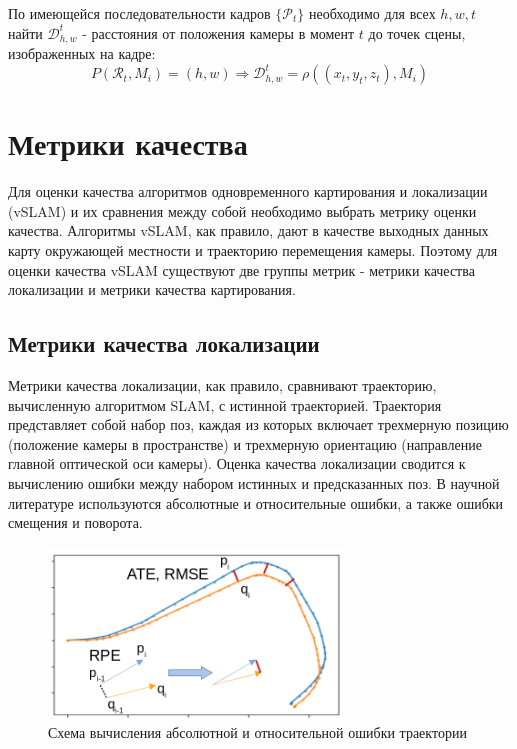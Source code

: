 \documentclass{mipt-thesis-ms}
\begin{document}
	По имеющейся последовательности кадров $\{\mathcal{P}_t\}$ необходимо для всех $h,w,t$ найти $\mathcal{D}^t_{h,w}$ - расстояния от положения камеры в момент $t$ до точек сцены, изображенных на кадре:
	$$P(\mathcal{R}_t, M_i) = (h, w) \Rightarrow \mathcal{D}^t_{h,w} = \rho((x_t, y_t, z_t), M_i)$$
	
	
	\section{Метрики качества}
	
	Для оценки качества алгоритмов одновременного картирования и локализации (vSLAM) и их сравнения между собой необходимо выбрать метрику оценки качества. Алгоритмы vSLAM, как правило, дают в качестве выходных данных карту окружающей местности и траекторию перемещения камеры. Поэтому для оценки качества vSLAM существуют две группы метрик - метрики качества локализации и метрики качества картирования.
	
	\subsection{Метрики качества локализации}
	
	Метрики качества локализации, как правило, сравнивают траекторию, вычисленную алгоритмом SLAM, с истинной траекторией. Траектория представляет собой набор поз, каждая из которых включает трехмерную позицию (положение камеры в пространстве) и трехмерную ориентацию (направление главной оптической оси камеры). Оценка качества локализации сводится к вычислению ошибки между набором истинных и предсказанных поз. В научной литературе используются абсолютные и относительные ошибки, а также ошибки смещения и поворота.
	
	\begin{figure}
		\centering
		\includegraphics[width=0.7\textwidth]{img/localization_metrics.png}
		\caption{Схема вычисления абсолютной и относительной ошибки траектории}
		\label{figure_ate_rpe}
	\end{figure}
	
\end{document}
